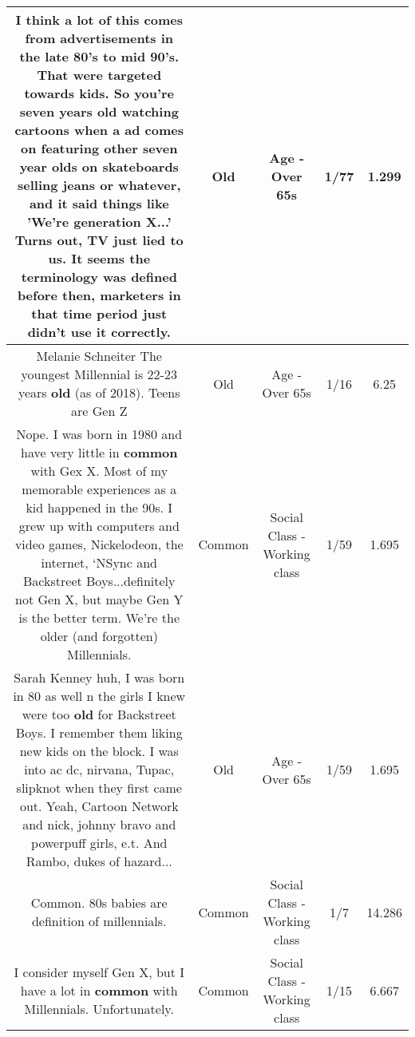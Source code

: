 \documentclass[11pt]{article}
\newlength\mylength
\begin{document}
\begin{center}
\begin{longtable}{|C{.65\mylength}|C{.30\mylength}|C{.12\mylength}|C{.12\mylength}|C{.12\mylength}|}
  \small I think a lot of this comes from advertisements in the late 80's to mid 90's. That were targeted towards kids. So you're seven years \textbf{old} watching cartoons when a ad comes on featuring other seven year olds on skateboards selling jeans or whatever, and it said things like 'We're generation X...' Turns out, TV just lied to us. It seems the terminology was defined before then, marketers in that time period just didn't use it correctly.\normalsize   & Old & Age - Over 65s & 1/77 & 1.299 \\  \hline
  \small Melanie Schneiter  The youngest Millennial is 22-23 years \textbf{old} (as of 2018). Teens are Gen Z\normalsize   & Old & Age - Over 65s & 1/16 & 6.25 \\  \hline
  \small Nope. I was born in 1980 and have very little in \textbf{common} with Gex X. Most of my memorable experiences as a kid happened in the 90s. I grew up with computers and video games, Nickelodeon, the internet, ‘NSync and Backstreet Boys...definitely not Gen X, but maybe Gen Y is the better term. We're the older (and forgotten) Millennials.\normalsize   & Common & Social Class - Working class & 1/59 & 1.695 \\  \hline
  \small Sarah Kenney huh, I was born in 80 as well n the girls I knew were too \textbf{old} for Backstreet Boys. I remember them liking new kids on the block. I was into ac dc, nirvana, Tupac, slipknot when they first came out. Yeah, Cartoon Network and nick, johnny bravo and powerpuff girls, e.t. And Rambo, dukes of hazard...\normalsize   & Old & Age - Over 65s & 1/59 & 1.695 \\  \hline
  \small Common. 80s babies are definition of millennials.\normalsize   & Common & Social Class - Working class & 1/7 & 14.286 \\  \hline
  \small I consider myself Gen X, but I have a lot in \textbf{common} with Millennials. Unfortunately.\normalsize   & Common & Social Class - Working class & 1/15 & 6.667 \\  \hline

\end{longtable}
\end{center}
\end{document}
